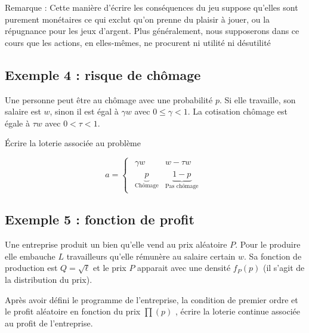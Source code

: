 \documentclass[a4paper, 12pt]{report}
\begin{document}
Remarque : Cette manière d'écrire les conséquences du jeu suppose qu'elles sont purement monétaires ce qui exclut qu'on prenne du plaisir à jouer, ou la répugnance pour les jeux d'argent. Plus généralement, nous supposerons dans ce cours que les actions, en elles-mêmes, ne procurent ni utilité ni désutilité

\subsection{Exemple 4 : risque de chômage}

Une personne peut être au chômage avec une probabilité $p$. Si elle travaille, son salaire est $w$, sinon il est égal à $\gamma w$ avec $0\le \gamma < 1$. La cotisation chômage est égale à $\tau w$ avec $0 < \tau < 1$.

Écrire la loterie associée au problème

$$
a=\begin{cases}
	\begin{matrix}\gamma w & w-\tau w \\ \underbrace{p}_{\text{Chômage}}& \underbrace{1-p}_{\text{Pas chômage}}\end{matrix}
\end{cases}
$$

\subsection{Exemple 5 : fonction de profit}

Une entreprise produit un bien qu'elle vend au prix aléatoire $P$. Pour le produire elle embauche $L$ travailleurs qu'elle rémunère au salaire certain $w$. Sa fonction de production est $Q=\sqrt{\ell}$ et le prix $P$ apparait avec une densité $f_P(p)$ (il s'agit de la distribution du prix).

Après avoir défini le programme de l'entreprise, la condition de premier ordre et le profit aléatoire en fonction du prix $\prod (p)$ , écrire la loterie continue associée au profit de l'entreprise.
\end{document}
